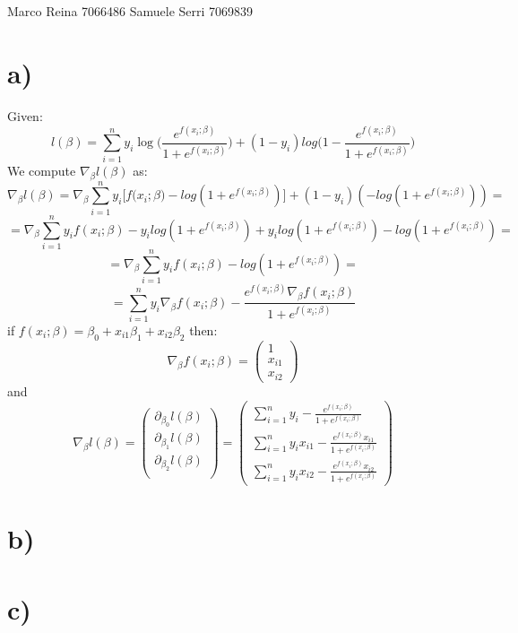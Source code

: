 \documentclass[12pt]{article}
\begin{document}
\section*{}
Marco Reina 7066486 \newline
Samuele Serri 7069839 \newline
\section*{a)}
Given: 
\begin{equation*}
    l(\beta) = \sum_{i = 1}^ny_i\log\Big(\frac{e^{f(x_i;\beta)}}{1 + e^{f(x_i;\beta)}}\Big) + (1 - y_i)log\Big(1 - \frac{e^{f(x_i;\beta)}}{1 + e^{f(x_i;\beta)}}\Big)
\end{equation*}
We compute $\nabla_\beta l(\beta)$ as:
\begin{equation*}
    \nabla_\beta l(\beta) = \nabla_\beta\sum_{i = 1}^ny_i\Big[f({x_i;\beta) - log(1 + e^{f(x_i;\beta)})}\Big] + (1 - y_i)(-log(1 + e^{f(x_i;\beta)})) = 
\end{equation*}
\begin{equation*}
    = \nabla_\beta\sum_{i = 1}^ny_i f(x_i;\beta) - y_i log(1 + e^{f(x_i;\beta)}) + y_i log(1 + e^{f(x_i;\beta)}) - log(1 + e^{f(x_i;\beta)}) = 
\end{equation*}
\begin{equation*}
    = \nabla_\beta\sum_{i = 1}^n y_i f(x_i; \beta) - log( 1 + e^{f(x_i;\beta)}) = 
\end{equation*}
\begin{equation*}
    = \sum_{i = 1}^n y_i\nabla_\beta f(x_i; \beta) - \frac{e^{f(x_i;\beta)}\nabla_\beta f(x_i; \beta)}{1 + e^{f(x_i;\beta)}}
\end{equation*}
if $f(x_i; \beta) = \beta_0 + x_{i1}\beta_1 + x_{i2}\beta_2$ then:
\begin{equation*}
    \nabla_\beta f(x_i; \beta) = \begin{pmatrix}
        1 \\ x_{i1} \\ x_{i2}
    \end{pmatrix}
\end{equation*}
and 
\begin{equation*}
    \nabla_\beta l(\beta) =  \begin{pmatrix}
        \partial_{\beta_0}l(\beta) \\
        \partial_{\beta_1}l(\beta) \\
        \partial_{\beta_2}l(\beta) \\
    \end{pmatrix}= \begin{pmatrix}
        \sum_{i = 1}^n y_i - \frac{e^{f(x_i;\beta)}}{1 + e^{f(x_i;\beta)}} \\
        \sum_{i = 1}^n y_i x_{i1} - \frac{e^{f(x_i;\beta)}x_{i1}}{1 + e^{f(x_i;\beta)}} \\
        \sum_{i = 1}^n y_i x_{i2} - \frac{e^{f(x_i;\beta)}x_{i2}}{1 + e^{f(x_i;\beta)}} 
    \end{pmatrix}
\end{equation*}
\section*{b)}
\section*{c)}
\end{document}
